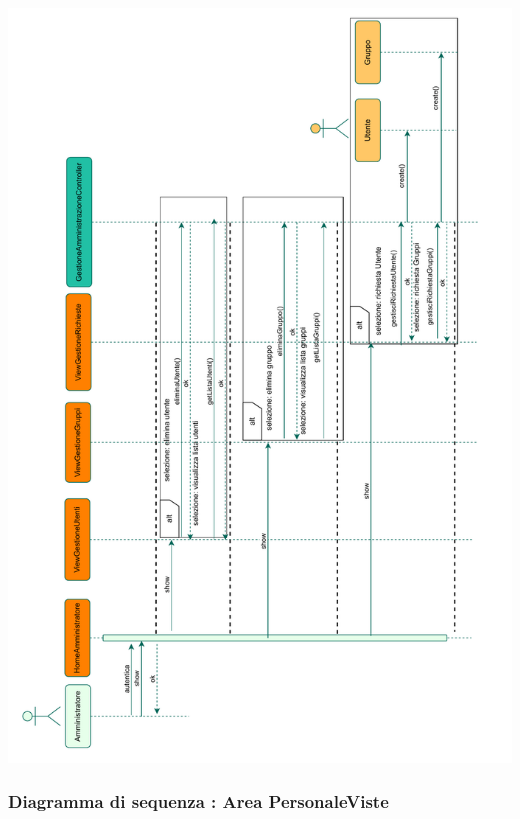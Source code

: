\vspace{0.5cm}
\begin{adjustwidth}{-1cm}{0cm}
\includegraphics[scale=0.8]{interazione/Package-Interazione-GestioneAmministratore.drawio.pdf}
\end{adjustwidth}

\subsubsection*{Diagramma di sequenza : Area Personale\-Viste}
\vspace{0.5cm}

